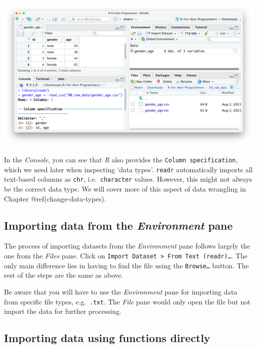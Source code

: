 \documentclass[
  letterpaper,
]{krantz}
\begin{document}
\begin{enumerate}
  \includegraphics{images/chapter_07_img/01_files_pane_import/04_files_pane_import.png}
\end{enumerate}

In the \emph{Console}, you can see that \emph{R} also provides the
\texttt{Column\ specification}, which we need later when inspecting
`data types'. \texttt{readr} automatically imports all text-based
columns as \texttt{chr}, i.e.~\texttt{character} values. However, this
might not always be the correct data type. We will cover more of this
aspect of data wrangling in Chapter @ref(change-data-types).

\subsection{\texorpdfstring{Importing data from the \emph{Environment}
pane}{Importing data from the Environment pane}}\label{sec-importing-data-from-the-environment-pane}

The process of importing datasets from the \emph{Environment} pane
follows largely the one from the \emph{Files} pane. Click on
\texttt{Import\ Dataset\ \textgreater{}\ From\ Text\ (readr)…}. The only
main difference lies in having to find the file using the
\texttt{Browse…} button. The rest of the steps are the same as above.

Be aware that you will have to use the \emph{Environment} pane for
importing data from specific file types, e.g.~\texttt{.txt}. The
\emph{File} pane would only open the file but not import the data for
further processing.

\subsection{Importing data using functions
directly}\label{sec-importing-data-using-functions}
\end{document}
